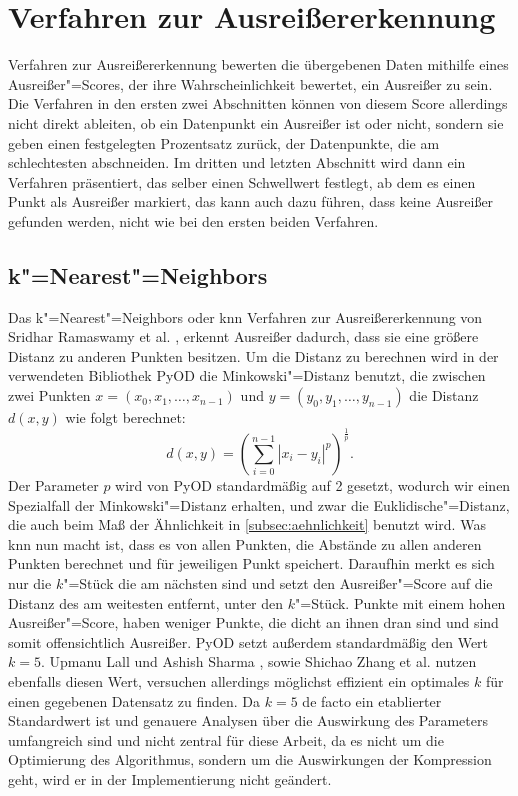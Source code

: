 \section{Verfahren zur Ausreißererkennung}
Verfahren zur Ausreißererkennung bewerten die übergebenen Daten mithilfe eines Ausreißer"=Scores, der ihre Wahrscheinlichkeit bewertet, ein Ausreißer zu sein. Die Verfahren in den ersten zwei Abschnitten können von diesem Score allerdings nicht direkt ableiten, ob ein Datenpunkt ein Ausreißer ist oder nicht, sondern sie geben einen festgelegten Prozentsatz zurück, der Datenpunkte, die am schlechtesten abschneiden. Im dritten und letzten Abschnitt wird dann ein Verfahren präsentiert, das selber einen Schwellwert festlegt, ab dem es einen Punkt als Ausreißer markiert, das kann auch dazu führen, dass keine Ausreißer gefunden werden, nicht wie bei den ersten beiden Verfahren.

\subsection{k"=Nearest"=Neighbors}
Das k"=Nearest"=Neighbors oder knn Verfahren zur Ausreißererkennung von Sridhar Ramaswamy et al. \cite{knn}, erkennt Ausreißer dadurch, dass sie eine größere Distanz zu anderen Punkten besitzen. Um die Distanz zu berechnen wird in der verwendeten Bibliothek PyOD \cite{pyod} die Minkowski"=Distanz \cite{minkowski} benutzt, die zwischen zwei Punkten $x = (x_0,x_1,\ldots,x_{n-1})$ und $y=(y_0,y_1,\ldots,y_{n-1})$ die Distanz $d(x,y)$ wie folgt berechnet:
\[d(x,y) = \left(\sum_{i=0}^{n-1}|x_i - y_i|^p\right)^{\frac{1}{p}}.\]
Der Parameter $p$ wird von PyOD standardmäßig auf 2 gesetzt, wodurch wir einen Spezialfall der Minkowski"=Distanz erhalten, und zwar die Euklidische"=Distanz, die auch beim Maß der Ähnlichkeit in \autoref{subsec:aehnlichkeit} benutzt wird. Was knn nun macht ist, dass es von allen Punkten, die Abstände zu allen anderen Punkten berechnet und für jeweiligen Punkt speichert. Daraufhin merkt es sich nur die $k$"=Stück die am nächsten sind und setzt den Ausreißer"=Score auf die Distanz des am weitesten entfernt, unter den $k$"=Stück. Punkte mit einem hohen Ausreißer"=Score, haben weniger Punkte, die dicht an ihnen dran sind und sind somit offensichtlich Ausreißer. PyOD setzt außerdem standardmäßig den Wert $k=5$. Upmanu Lall und Ashish Sharma \cite{kauswahl}, sowie Shichao Zhang et al. \cite{kauswahl2} nutzen ebenfalls diesen Wert, versuchen allerdings möglichst effizient ein optimales $k$ für einen gegebenen Datensatz zu finden. Da $k=5$ de facto ein etablierter Standardwert ist und genauere Analysen über die Auswirkung des Parameters umfangreich sind \cite{kauswahl2} und nicht zentral für diese Arbeit, da es nicht um die Optimierung des Algorithmus, sondern um die Auswirkungen der Kompression geht, wird er in der Implementierung nicht geändert.

